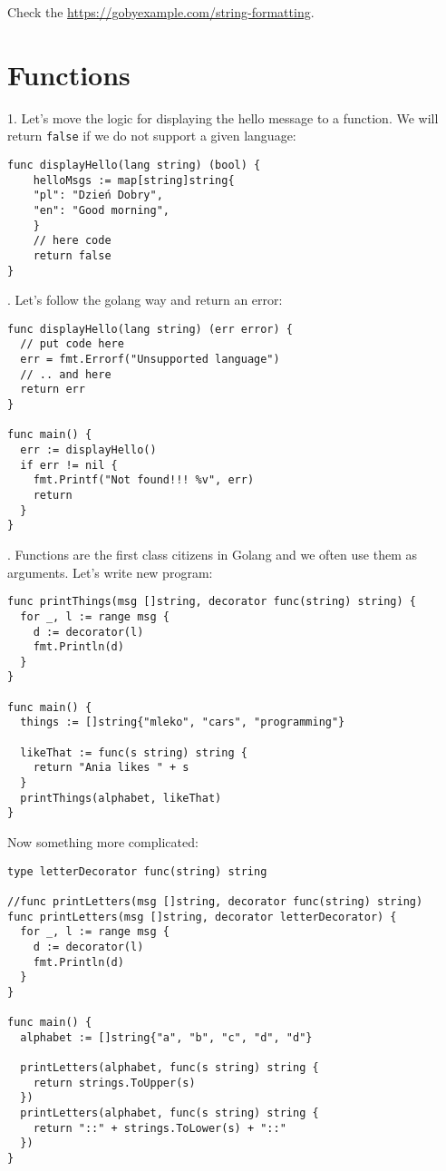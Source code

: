 \documentclass[11pt, letterpaper]{article}
\begin{document}
Check the \href{https://gobyexample.com/string-formatting}{https://gobyexample.com/string-formatting}.

\section{Functions}

1. Let's move the logic for displaying the hello message to a function. We will return \verb|false| if we do not support a given language:

\begin{verbatim}
func displayHello(lang string) (bool) {
    helloMsgs := map[string]string{
    "pl": "Dzień Dobry",
    "en": "Good morning",
    }
    // here code
    return false
}
\end{verbatim}

. Let's follow the golang way and return an error:

\begin{verbatim}
func displayHello(lang string) (err error) {
  // put code here
  err = fmt.Errorf("Unsupported language")
  // .. and here
  return err
}

func main() {
  err := displayHello()
  if err != nil {
    fmt.Printf("Not found!!! %v", err)
    return
  }
}
\end{verbatim}

. Functions are the first class citizens in Golang and we often use them as arguments. Let's write new program:

\begin{verbatim}
func printThings(msg []string, decorator func(string) string) {
  for _, l := range msg {
    d := decorator(l)
    fmt.Println(d)
  }
}

func main() {
  things := []string{"mleko", "cars", "programming"}

  likeThat := func(s string) string {
    return "Ania likes " + s
  }
  printThings(alphabet, likeThat)
}
\end{verbatim}

Now something more complicated:

\begin{verbatim}
type letterDecorator func(string) string

//func printLetters(msg []string, decorator func(string) string)
func printLetters(msg []string, decorator letterDecorator) {
  for _, l := range msg {
    d := decorator(l)
    fmt.Println(d)
  }
}

func main() {
  alphabet := []string{"a", "b", "c", "d", "d"}

  printLetters(alphabet, func(s string) string {
    return strings.ToUpper(s)
  })
  printLetters(alphabet, func(s string) string {
    return "::" + strings.ToLower(s) + "::"
  })
}
\end{verbatim}
\end{document}
